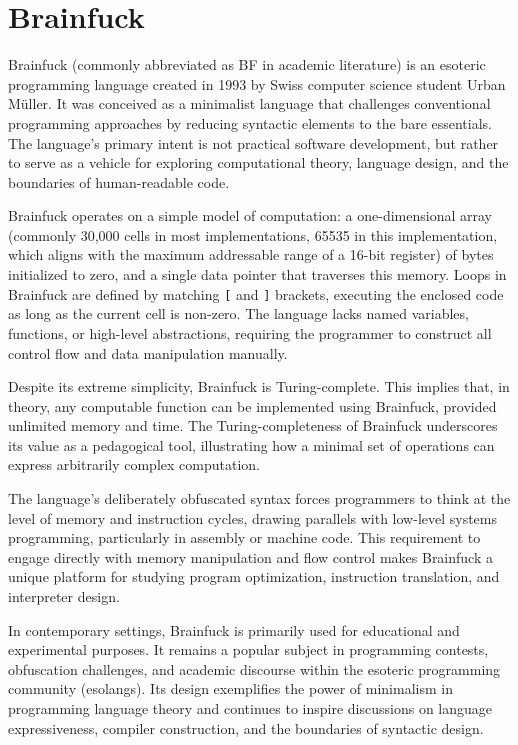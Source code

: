 \chapter{Brainfuck}
\label{chap:ch2}

\par Brainfuck (commonly abbreviated as BF in academic literature) is an esoteric programming language created in 1993 by Swiss computer science student Urban Müller. It was conceived as a minimalist language that challenges conventional programming approaches by reducing syntactic elements to the bare essentials. The language's primary intent is not practical software development, but rather to serve as a vehicle for exploring computational theory, language design, and the boundaries of human-readable code.

\par Brainfuck operates on a simple model of computation: a one-dimensional array (commonly 30,000 cells in most implementations, 65535 in this implementation, which aligns with the maximum addressable range of a 16-bit register) of bytes initialized to zero, and a single data pointer that traverses this memory. Loops in Brainfuck are defined by matching \texttt{[} and \texttt{]} brackets, executing the enclosed code as long as the current cell is non-zero. The language lacks named variables, functions, or high-level abstractions, requiring the programmer to construct all control flow and data manipulation manually.

\par Despite its extreme simplicity, Brainfuck is Turing-complete. This implies that, in theory, any computable function can be implemented using Brainfuck, provided unlimited memory and time. The Turing-completeness of Brainfuck underscores its value as a pedagogical tool, illustrating how a minimal set of operations can express arbitrarily complex computation.

\par The language's deliberately obfuscated syntax forces programmers to think at the level of memory and instruction cycles, drawing parallels with low-level systems programming, particularly in assembly or machine code. This requirement to engage directly with memory manipulation and flow control makes Brainfuck a unique platform for studying program optimization, instruction translation, and interpreter design.

\par In contemporary settings, Brainfuck is primarily used for educational and experimental purposes. It remains a popular subject in programming contests, obfuscation challenges, and academic discourse within the esoteric programming community (esolangs). Its design exemplifies the power of minimalism in programming language theory and continues to inspire discussions on language expressiveness, compiler construction, and the boundaries of syntactic design.

